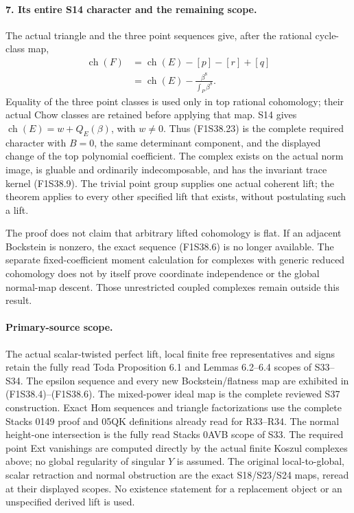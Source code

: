 \paragraph{7. Its entire S14 character and the remaining scope.}
The actual triangle and the three point sequences give, after
the rational cycle-class map,
\[
\begin{split}
 \operatorname{ch}(F)
   &=\operatorname{ch}(E)-[p]-[r]+[q]\\
   &=\operatorname{ch}(E)-\frac{\beta^8}{\int_P\beta^8}.
\end{split}
 \tag{F1S38.23}
\]
Equality of the three point classes is used only in top
rational cohomology; their actual Chow classes are retained
before applying that map. S14 gives
$\operatorname{ch}(E)=w+Q_E(\beta)$, with $w\ne0$.
Thus (F1S38.23) is the complete required character with $B=0$,
the same determinant component, and the displayed change of
the top polynomial coefficient. The complex exists on the
actual norm image, is gluable and ordinarily indecomposable,
and has the invariant trace kernel (F1S38.9). The trivial
point group supplies one actual coherent lift; the theorem
applies to every other specified lift that exists, without
postulating such a lift.

The proof does not claim that arbitrary lifted cohomology is
flat. If an adjacent Bockstein is nonzero, the exact sequence
(F1S38.6) is no longer available. The separate fixed-coefficient
moment calculation for complexes with generic reduced
cohomology does not by itself prove coordinate independence
or the global normal-map descent. Those unrestricted coupled
complexes remain outside this result.

\paragraph{Primary-source scope.}
The actual scalar-twisted perfect lift, local finite free
representatives and signs retain the fully read Toda
Proposition 6.1 and Lemmas 6.2--6.4 scopes of S33--S34.
The epsilon sequence and every new Bockstein/flatness map
are exhibited in (F1S38.4)--(F1S38.6).
The mixed-power ideal map is the complete reviewed S37
construction. Exact Hom sequences and triangle factorizations
use the complete Stacks 0149 proof and 05QK definitions already
read for R33--R34. The normal height-one intersection is the
fully read Stacks 0AVB scope of S33. The required point Ext
vanishings are computed directly by the actual finite Koszul
complexes above; no global regularity of singular $Y$ is assumed.
The original local-to-global, scalar retraction and normal
obstruction are the exact S18/S23/S24 maps, reread at their
displayed scopes. No existence statement for a replacement
object or an unspecified derived lift is used.
